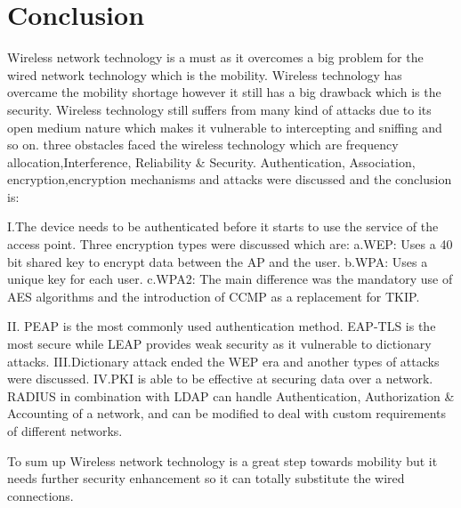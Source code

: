 \chapter{Conclusion}
\label{chap:conclusion}

Wireless network technology is a must as it overcomes a big problem for the wired network technology which is the mobility. Wireless technology has overcame the mobility shortage however it still has a big drawback which is the security. Wireless technology still suffers from many kind of attacks due to its open medium nature which makes it vulnerable to intercepting and sniffing and so on. three obstacles faced the wireless technology which are frequency allocation,Interference, Reliability \& Security. Authentication, Association, encryption,encryption mechanisms and attacks were discussed and the conclusion is:

I.The device needs to be authenticated before it starts to use the service of the access point. Three encryption types were discussed which are:
	a.WEP: Uses a 40 bit shared key to encrypt data between the AP and the user.
	b.WPA: Uses a unique key for each user.
	c.WPA2: The main difference was the mandatory use of AES algorithms and the introduction of CCMP as a replacement for TKIP.

II. PEAP is the most commonly used authentication method. EAP-TLS is the most secure while LEAP provides weak security as it vulnerable to dictionary attacks.
III.Dictionary attack ended the WEP era and another types of attacks were discussed.
IV.PKI is able to be effective at securing data over a network. RADIUS in combination with LDAP can handle Authentication, Authorization \& Accounting of a network, and can be modified to deal with custom requirements of different networks.

To sum up Wireless network technology is a great step towards mobility but it needs further security enhancement so it can totally substitute the wired connections.

